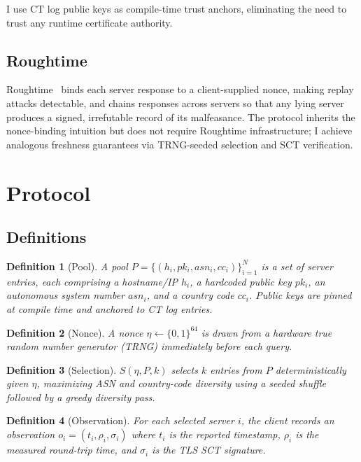 \documentclass[11pt,twocolumn]{article}
\newtheorem{definition}{Definition}
\begin{document}
I use CT log public keys as compile-time trust anchors, eliminating the need
to trust any runtime certificate authority.

\subsection{Roughtime}

Roughtime~\cite{roughtime} binds each server response to a client-supplied
nonce, making replay attacks detectable, and chains responses across servers so
that any lying server produces a signed, irrefutable record of its
malfeasance.  The protocol inherits the nonce-binding intuition but does not
require Roughtime infrastructure; I achieve analogous freshness guarantees via
TRNG-seeded selection and SCT verification.

\section{Protocol}

\subsection{Definitions}

\begin{definition}[Pool]
  A pool $P = \{(h_i, pk_i, \mathit{asn}_i, \mathit{cc}_i)\}_{i=1}^{N}$ is a
  set of server entries, each comprising a hostname/IP $h_i$, a hardcoded
  public key $pk_i$, an autonomous system number $\mathit{asn}_i$, and a
  country code $\mathit{cc}_i$.  Public keys are pinned at compile time and
  anchored to CT log entries.
\end{definition}

\begin{definition}[Nonce]
  A nonce $\eta \leftarrow \{0,1\}^{64}$ is drawn from a hardware true random
  number generator (TRNG) immediately before each query.
\end{definition}

\begin{definition}[Selection]
  $S(\eta, P, k)$ selects $k$ entries from $P$ deterministically given $\eta$,
  maximizing ASN and country-code diversity using a seeded shuffle followed by
  a greedy diversity pass.
\end{definition}

\begin{definition}[Observation]
  For each selected server $i$, the client records an observation
  $o_i = (t_i, \rho_i, \sigma_i)$ where $t_i$ is the reported timestamp,
  $\rho_i$ is the measured round-trip time, and $\sigma_i$ is the TLS SCT
  signature.
\end{definition}
\end{document}
